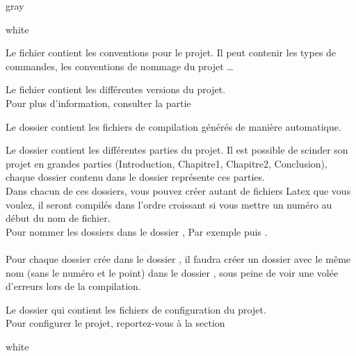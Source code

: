 \begin{items}{gray}{\faFolder}
\begin{items}{white}{}
        \item Le fichier  contient les conventions pour le projet. Il peut contenir les types de commandes, 
        les conventions de nommage du projet \ldots

        \item Le fichier  contient les différentes versions du projet. \\ Pour plus d'information, 
        consulter la partie 

    \end{items}
    \item Le dossier  contient les fichiers de compilation générés de manière automatique. 

    \item Le dossier  contient les différentes parties du projet. Il est possible de scinder son projet 
    en grandes parties (Introduction, Chapitre1, Chapitre2, Conclusion), chaque dossier contenu dans le 
    dossier  représente ces parties.\\

    Dans chacun de ces dossiers, vous pouvez créer autant de fichiers Latex que vous voulez, il seront compilés dans 
    l'ordre croissant si vous mettre un numéro au début du nom de fichier.\\

    Pour nommer les dossiers dans le dossier ,  Par exemple  puis .\\
    \\

    Pour chaque dossier crée dans le dossier , il faudra créer un dossier avec le même nom (sans le numéro et le point) dans le dossier 
    , sous peine de voir une volée d'erreurs lors de la compilation.\\

    \item Le dossier  qui contient les fichiers de configuration du projet.\\
    Pour configurer le projet, reportez-vous à la section 

    \begin{items}{white}{}


\end{items}
\end{items}
